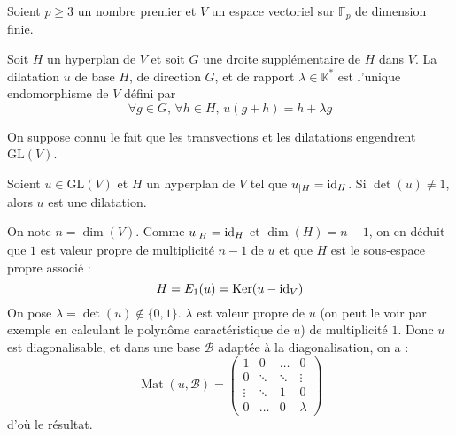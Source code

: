 




	Soient $p \geq 3$ un nombre premier et $V$ un espace vectoriel sur $\mathbb{F}_p$ de dimension finie.


	\begin{definition}
		Soit $H$ un hyperplan de $V$ et soit $G$ une droite supplémentaire de $H$ dans $V$.
		La dilatation $u$ de base $H$, de direction $G$, et de rapport $\lambda \in \mathbb{K}^*$ est l'unique endomorphisme de $V$ défini par
		\[ \forall g \in G, \, \forall h \in H, \, u(g+h) = h + \lambda g \]
	\end{definition}


	\begin{remark}
		\label{theoreme-de-frobenius-zolotarev-1}
		On suppose connu le fait que les transvections et les dilatations engendrent $\mathrm{GL}(V)$.
	\end{remark}


	\begin{lemma}
		\label{theoreme-de-frobenius-zolotarev-2}
		Soient $u \in \mathrm{GL}(V)$ et $H$ un hyperplan de $V$ tel que $u_{|H} = \operatorname{id}_H$. Si $\det(u) \neq 1$, alors $u$ est une dilatation.
	\end{lemma}

	\begin{demonstration}
		On note $n = \dim(V)$. Comme $u_{|H} = \operatorname{id}_H$ et $\dim(H) = n-1$, on en déduit que $1$ est valeur propre de multiplicité $n-1$ de $u$ et que $H$ est le sous-espace propre associé :
		\[ H = E_1(u) = \mathrm{Ker}(u - \operatorname{id}_V) \]
		On pose $\lambda = \det(u) \notin \{ 0, 1 \}$. $\lambda$ est valeur propre de $u$ (on peut le voir par exemple en calculant le polynôme caractéristique de $u$) de multiplicité $1$. Donc $u$ est diagonalisable, et dans une base $\mathcal{B}$ adaptée à la diagonalisation, on a :
		\[ \operatorname{Mat}(u, \mathcal{B}) =
		\begin{pmatrix}
			1 & 0 & \dots & 0 \\
			0 & \ddots & \ddots & \vdots \\
			\vdots & \ddots & 1 & 0 \\
			0 & \dots & 0 & \lambda
		\end{pmatrix}
		\]
		d'où le résultat.
	\end{demonstration}

